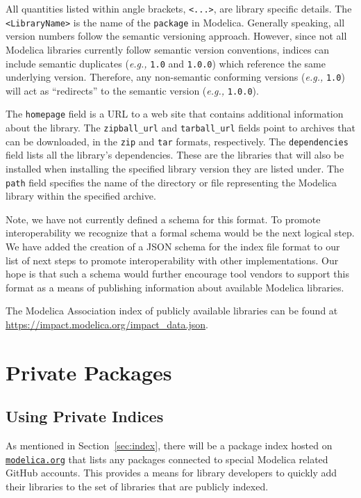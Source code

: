 \documentclass[11pt,a4paper,twocolumn]{article}
\newcommand{\code}[1]{\texttt{#1}} %
\begin{document}
All quantities listed within angle brackets, \code{<...>}, are library
specific details.  The \code{<LibraryName>} is the name of the
\code{package} in Modelica.  Generally speaking, all version numbers
follow the semantic versioning approach.  However, since not all
Modelica libraries currently follow semantic version conventions,
indices can include semantic duplicates (\textit{e.g.,} \code{1.0} and
\code{1.0.0}) which reference the same underlying version.  Therefore,
any non-semantic conforming versions (\textit{e.g.,} \code{1.0}) will
act as ``redirects'' to the semantic version (\textit{e.g.,}
\code{1.0.0}).

The \code{homepage} field is a URL to a web site that contains
additional information about the library.  The \code{zipball\_url} and
\code{tarball\_url} fields point to archives that can be downloaded,
in the \code{zip} and \code{tar} formats, respectively.  The
\code{dependencies} field lists all the library's dependencies.  These
are the libraries that will also be installed when installing the
specified library version they are listed under.  The \code{path}
field specifies the name of the directory or file representing the
Modelica library within the specified archive.

Note, we have not currently defined a schema for this format.  To
promote interoperability we recognize that a formal schema would be the
next logical step.  We have added the creation of a JSON schema for
the index file format to our list of next steps to promote
interoperability with other implementations.  Our hope is that such a
schema would further encourage tool vendors to support this format as
a means of publishing information about available Modelica libraries.

The Modelica Association index of publicly available libraries can
be found at \url{https://impact.modelica.org/impact\_data.json}.

\section{Private Packages}
\label{sec:private}

\subsection{Using Private Indices}
\label{sec:use_private}

As mentioned in Section~\ref{sec:index}, there will be a package index
hosted on \href{https://modelica.org}{\code{modelica.org}} that lists
any packages connected to special Modelica related GitHub accounts.
This provides a means for library developers to quickly add their
libraries to the set of libraries that are publicly indexed.
\end{document}
